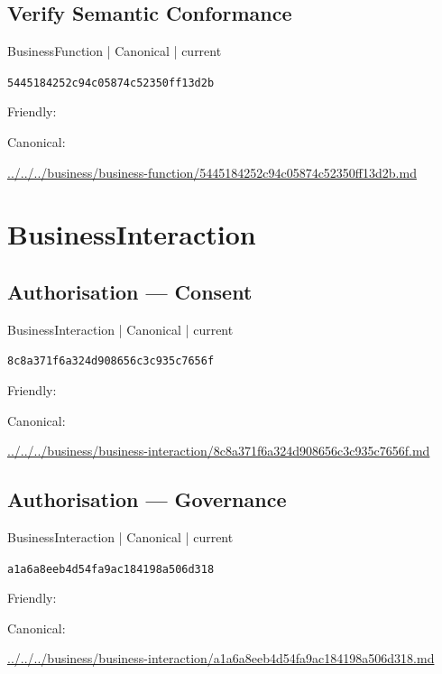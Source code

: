 \documentclass[10pt,a4paper]{article}
\begin{document}
\subsection*{Verify Semantic Conformance}
{\small BusinessFunction | Canonical | current}\par
\texttt{5445184252c94c05874c52350ff13d2b}\par
Friendly: \par
Canonical: \par
{\footnotesize\url{../../../business/business-function/5445184252c94c05874c52350ff13d2b.md}}\par
\section*{BusinessInteraction}
\subsection*{Authorisation — Consent}
{\small BusinessInteraction | Canonical | current}\par
\texttt{8c8a371f6a324d908656c3c935c7656f}\par
Friendly: \par
Canonical: \par
{\footnotesize\url{../../../business/business-interaction/8c8a371f6a324d908656c3c935c7656f.md}}\par
\subsection*{Authorisation — Governance}
{\small BusinessInteraction | Canonical | current}\par
\texttt{a1a6a8eeb4d54fa9ac184198a506d318}\par
Friendly: \par
Canonical: \par
{\footnotesize\url{../../../business/business-interaction/a1a6a8eeb4d54fa9ac184198a506d318.md}}\par
\end{document}
